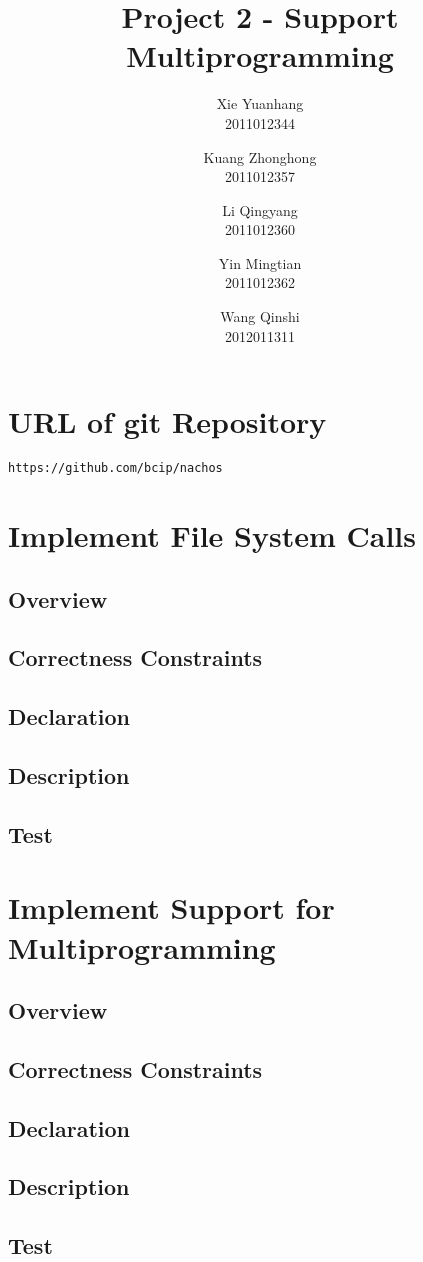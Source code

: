 \documentclass{article}
\title{Project 2 - Support Multiprogramming}
\author{Xie Yuanhang\\ 2011012344\and
Kuang Zhonghong\\ 2011012357\and
Li Qingyang\\ 2011012360\and
Yin Mingtian\\ 2011012362\and
Wang Qinshi\\ 2012011311}
\date{}
\begin{document}
\maketitle
\tableofcontents{}
\section{URL of git Repository}
\texttt{https://github.com/bcip/nachos}
\section{Implement File System Calls}
\subsection{Overview}
\subsection{Correctness Constraints}
\subsection{Declaration}
\subsection{Description}
\subsection{Test}

\section{Implement Support for Multiprogramming}
\subsection{Overview}
\subsection{Correctness Constraints}
\subsection{Declaration}
\subsection{Description}
\subsection{Test}
\end{document}

